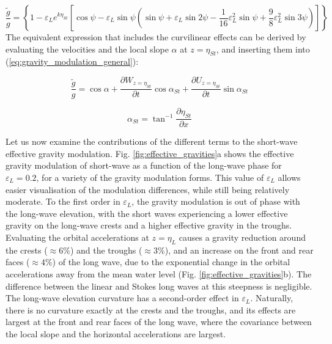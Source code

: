 \documentclass[lineno]{jfm}
\begin{document}
\begin{equation}
\label{eq:gravity_modulation_stokes}
\frac{\widetilde{g}}{g} =
\left\{
  1 - \varepsilon_L e^{k \eta_{St}}
  \left[ \cos{\psi} -
    \varepsilon_L \sin{\psi} \left(
      \sin{\psi}
      + \varepsilon_L \sin{2\psi}
      - \dfrac{1}{16} \varepsilon_L^2 \sin{\psi}
      + \dfrac{9}{8} \varepsilon_L^2 \sin{3\psi}
    \right)
  \right]
\right\}
\end{equation}
The equivalent expression that includes the curvilinear effects can be derived
by evaluating the velocities and the local slope $\alpha$ at $z = \eta_{St}$,
and inserting them into (\ref{eq:gravity_modulation_general}):

\begin{equation}
\label{eq:gravity_modulation_general_stokes}
\frac{\widetilde{g}}{g}
  = \cos{\alpha} 
  + \dfrac{\partial W_{z=\eta_{St}}}{\partial t} \cos{\alpha_{St}}
  + \dfrac{\partial U_{z=\eta_{St}}}{\partial t} \sin{\alpha_{St}}
\end{equation}

\begin{equation}
\label{eq:local_slope_stokes}
\alpha_{St} = \tan^{-1}{\dfrac{\partial \eta_{St}}{\partial x}}
\end{equation}

Let us now examine the contributions of the different terms to the short-wave
effective gravity modulation.
Fig. \ref{fig:effective_gravities}a shows the effective gravity modulation of
short-wave as a function of the long-wave phase for $\varepsilon_L = 0.2$, for
a variety of the gravity modulation forms.
This value of $\varepsilon_L$ allows easier visualisation of the modulation
differences, while still being relatively moderate.
To the first order in $\varepsilon_L$, the gravity modulation is out of phase
with the long-wave elevation, with the short waves experiencing a lower effective
gravity on the long-wave crests and a higher effective gravity in the troughs.
Evaluating the orbital accelerations at $z=\eta_L$ causes a gravity reduction
around the crests ($\approx6\%$) and the troughs ($\approx 3\%$), and an
increase on the front and rear faces ($\approx 4\%$) of the long wave, due to
the exponential change in the orbital accelerations away from the mean water level
(Fig. \ref{fig:effective_gravities}b).
The difference between the linear and Stokes long waves at this steepness is
negligible.
The long-wave elevation curvature has a second-order effect in $\varepsilon_L$.
Naturally, there is no curvature exactly at the crests and the troughs, and its
effects are largest at the front and rear faces of the long wave, where the
covariance between the local slope and the horizontal accelerations are largest.
\end{document}
